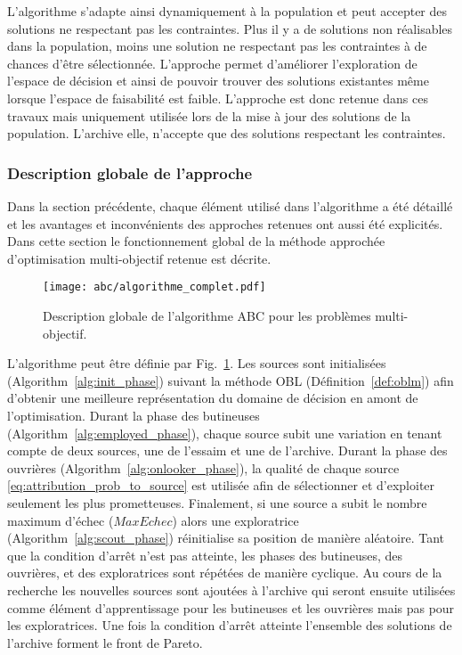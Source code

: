 L’algorithme s’adapte ainsi dynamiquement à la population et peut accepter des
solutions ne respectant pas les contraintes. Plus il y a de solutions non
réalisables dans la population, moins une solution ne respectant pas les contraintes à
de chances d’être sélectionnée. L’approche permet d’améliorer l’exploration de
l’espace de décision et ainsi de pouvoir trouver des solutions existantes même
lorsque l’espace de faisabilité est faible.
L’approche est donc retenue dans ces travaux mais uniquement utilisée lors de la mise à jour
des solutions de la population. L’archive elle, n’accepte que des solutions respectant les
contraintes.


\subsubsection{Description globale de l’approche} %
\label{ssub:description_globale_de_l_approche}
Dans la section précédente, chaque élément utilisé dans l’algorithme a été détaillé et
les avantages et inconvénients des approches retenues ont aussi été explicités.
Dans cette section le fonctionnement global de la méthode approchée d’optimisation
multi-objectif retenue est décrite.

\begin{figure}
    \begin{center}
        \texttt{[image: abc/algorithme\_complet.pdf]}
    \end{center}
    \caption{Description globale de l’algorithme ABC pour les problèmes multi-objectif.
             \label{fig:abc_complet}}
\end{figure}

L’algorithme peut être définie par Fig.~\ref{fig:abc_complet}.
Les sources sont initialisées (Algorithm~\ref{alg:init_phase}) suivant la méthode
OBL (Définition~\ref{def:oblm}) afin d’obtenir une meilleure représentation du
domaine de décision en amont de l’optimisation.
Durant la phase des butineuses (Algorithm~\ref{alg:employed_phase}), chaque source
subit une variation en tenant compte de deux sources, une de l’essaim et une de l’archive.
Durant la phase des ouvrières (Algorithm~\ref{alg:onlooker_phase}), la qualité de
chaque source \eqref{eq:attribution_prob_to_source} est utilisée afin de sélectionner
et d’exploiter seulement les plus prometteuses. Finalement, si une source a subit le
nombre maximum d’échec ($MaxEchec$) alors une exploratrice (Algorithm~\ref{alg:scout_phase})
réinitialise sa position de manière aléatoire.
Tant que la condition d’arrêt n’est pas atteinte, les phases des butineuses,
des ouvrières, et des exploratrices sont répétées de manière cyclique. Au cours de
la recherche les nouvelles sources sont ajoutées à l’archive qui seront ensuite utilisées
comme élément d’apprentissage pour les butineuses et les ouvrières mais pas pour les
exploratrices. Une fois la condition d’arrêt atteinte l’ensemble des solutions
de l’archive forment le front de Pareto.

